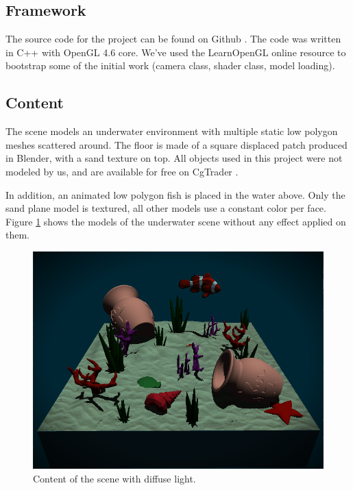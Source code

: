 \documentclass{article}
\begin{document}
\subsection{Framework}
\label{sec:framework_par}

The source code for the project can be found on Github \cite{watercolor_underwater}. 
The code was written in C++ with OpenGL 4.6 core. We've used the LearnOpenGL \cite{learnopengl} 
online resource to bootstrap some of the initial work (camera class, shader class, model loading).

\subsection{Content}
The scene models an underwater environment with multiple static low polygon meshes scattered around. 
The floor is made of a square displaced patch produced in Blender, with a sand texture on top. 
All objects used in this project were not modeled by us, and are available for free on CgTrader \cite{cgtrader}.

\medskip \par
\noindent
In addition, an animated low polygon fish is placed in the water above. 
Only the sand plane model is textured, all other models use a constant color per face. 
Figure \ref{fig:scene_content} shows the models of the underwater scene without any effect applied on them.

\begin{figure}[h]
    \centering
    \includegraphics[width=.9\columnwidth]{imgs/scene_contents.png}
    \caption{Content of the scene with diffuse light.}
    \label{fig:scene_content}
\end{figure}
\end{document}
